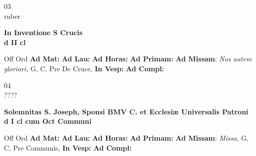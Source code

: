 \documentclass[10pt, openany]{book}
\begin{document}
    \begin{center}
        \begin{minipage}{3.5in}
            \vspace{2em}
            \begin{minipage}{0.5in}
                {\Huge 03} \\
                {\normalsize ruber}
            \end{minipage}
            \begin{minipage}{3.0in}
                \textbf{ \large In Inventione S Crucis \\
                \textnormal{\normalsize d II cl}}

            \end{minipage}
            \begin{justify}Off Ord
                \textbf{Ad Mat: }
                \textbf{Ad Lau: }
                \textbf{Ad Horas: }
                \textbf{Ad Primam: }\textbf{Ad Missam}: \textit{Nos autem gloriari,} G, C, Pre De Cruce, 
                \textbf{In Vesp: }
                \textbf{Ad Compl: }
            \end{justify}
        \end{minipage}
    \end{center}

    \begin{center}
        \begin{minipage}{3.5in}
            \vspace{2em}
            \begin{minipage}{0.5in}
                {\Huge 04} \\
                {\normalsize ????}
            \end{minipage}
            \begin{minipage}{3.0in}
                \textbf{ \large Solemnitas S. Joseph, Sponsi BMV C. et Ecclesiæ Universalis Patroni \\
                \textnormal{\normalsize d I cl cum Oct Communi}}

            \end{minipage}
            \begin{justify}Off Ord
                \textbf{Ad Mat: }
                \textbf{Ad Lau: }
                \textbf{Ad Horas: }
                \textbf{Ad Primam: }\textbf{Ad Missam}: \textit{Missa,} G, C, Pre Communis, 
                \textbf{In Vesp: }
                \textbf{Ad Compl: }
            \end{justify}
        \end{minipage}
    \end{center}
\end{document}
